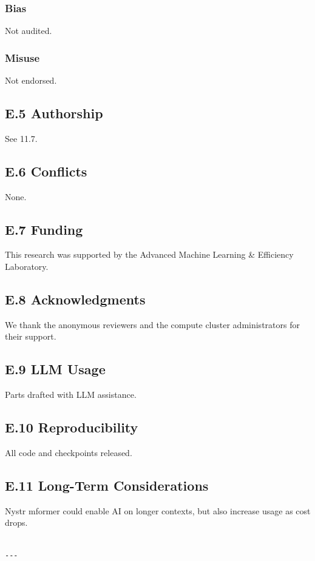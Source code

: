 \subsubsection{Bias}
Not audited.

\subsubsection{Misuse}
Not endorsed.

\subsection{E.5 Authorship}
See  11.7.

\subsection{E.6 Conflicts}
None.

\subsection{E.7 Funding}
This research was supported by the Advanced Machine Learning & Efficiency Laboratory.

\subsection{E.8 Acknowledgments}
We thank the anonymous reviewers and the compute cluster administrators for their support.

\subsection{E.9 LLM Usage}
Parts drafted with LLM assistance.

\subsection{E.10 Reproducibility}
All code and checkpoints released.

\subsection{E.11 Long-Term Considerations}
Nystr mformer could enable AI on longer contexts, but also increase usage 
as cost drops.
\begin{lstlisting}

---
\end{lstlisting}